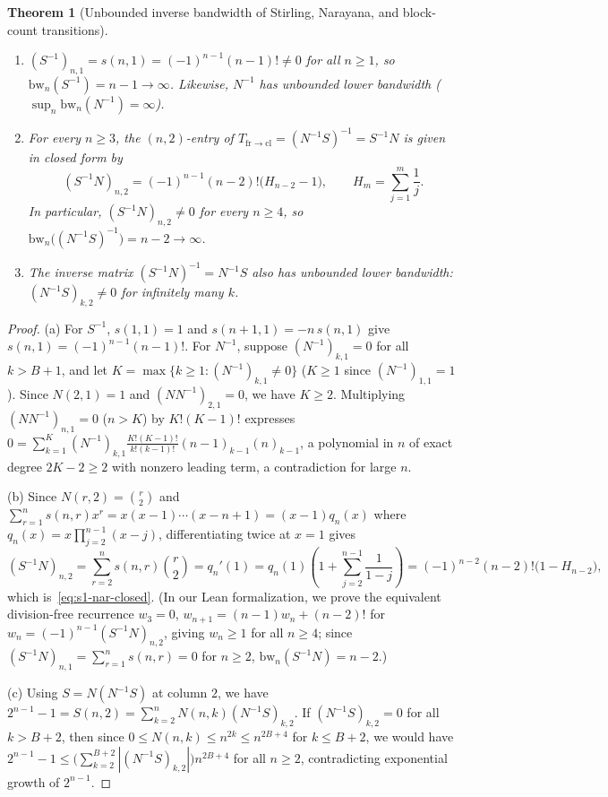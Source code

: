 \documentclass[11pt,a4paper]{article}
\newtheorem{theorem}{Theorem}[section]
\theoremstyle{definition}
\theoremstyle{remark}
\newcommand{\cl}{\mathrm{cl}}
\newcommand{\fr}{\mathrm{fr}}
\begin{document}
\begin{theorem}[Unbounded inverse bandwidth of Stirling, Narayana, and block-count transitions]\label{thm:stirling-narayana-bw}
\leavevmode
\begin{enumerate}
  \item[(a)] $(S^{-1})_{n,1} = s(n,1) = (-1)^{n-1}(n-1)! \ne 0$ for all $n \ge 1$, so $\mathrm{bw}_n(S^{-1}) = n - 1 \to \infty$. Likewise, $N^{-1}$ has unbounded lower bandwidth ($\sup_n \mathrm{bw}_n(N^{-1}) = \infty$).
  \item[(b)] For every $n \ge 3$, the $(n,2)$-entry of $T_{\fr\to\cl} = (N^{-1}S)^{-1} = S^{-1}N$ is given in closed form by
  \begin{equation}\label{eq:s1-nar-closed}
    (S^{-1}N)_{n,2} = (-1)^{n-1}(n - 2)!\bigl(H_{n-2} - 1\bigr), \qquad H_m = \sum_{j=1}^m \frac{1}{j}.
  \end{equation}
  In particular, $(S^{-1}N)_{n,2} \ne 0$ for every $n \ge 4$, so $\mathrm{bw}_n\bigl((N^{-1}S)^{-1}\bigr) = n - 2 \to \infty$.
  \item[(c)] The inverse matrix $(S^{-1}N)^{-1} = N^{-1}S$ also has unbounded lower bandwidth: $(N^{-1}S)_{k,2} \ne 0$ for infinitely many $k$.
\end{enumerate}
\end{theorem}

\begin{proof}
(a) For $S^{-1}$, $s(1,1) = 1$ and $s(n+1,1) = -n\,s(n,1)$ give $s(n,1) = (-1)^{n-1}(n-1)!$. For $N^{-1}$, suppose $(N^{-1})_{k,1} = 0$ for all $k > B + 1$, and let $K = \max\{k \ge 1 : (N^{-1})_{k,1} \ne 0\}$ ($K \ge 1$ since $(N^{-1})_{1,1} = 1$). Since $N(2,1) = 1$ and $(N N^{-1})_{2,1} = 0$, we have $K \ge 2$. Multiplying $(N N^{-1})_{n,1} = 0$ ($n > K$) by $K!(K-1)!$ expresses $0 = \sum_{k=1}^K (N^{-1})_{k,1} \frac{K!(K-1)!}{k!(k-1)!} (n-1)_{k-1}(n)_{k-1}$, a polynomial in $n$ of exact degree $2K - 2 \ge 2$ with nonzero leading term, a contradiction for large $n$.

(b) Since $N(r,2) = \binom{r}{2}$ and $\sum_{r=1}^n s(n,r) x^r = x(x-1)\cdots(x-n+1) = (x-1)q_n(x)$ where $q_n(x) = x\prod_{j=2}^{n-1}(x-j)$, differentiating twice at $x = 1$ gives
\[
  (S^{-1}N)_{n,2} = \sum_{r=2}^n s(n,r)\binom{r}{2} = q_n'(1) = q_n(1)\left(1 + \sum_{j=2}^{n-1}\frac{1}{1-j}\right) = (-1)^{n-2}(n-2)!\bigl(1 - H_{n-2}\bigr),
\]
which is~\eqref{eq:s1-nar-closed}. (In our Lean formalization, we prove the equivalent division-free recurrence $w_3 = 0$, $w_{n+1} = (n-1)w_n + (n-2)!$ for $w_n = (-1)^{n-1}(S^{-1}N)_{n,2}$, giving $w_n \ge 1$ for all $n \ge 4$; since $(S^{-1}N)_{n,1} = \sum_{r=1}^n s(n,r) = 0$ for $n \ge 2$, $\mathrm{bw}_n(S^{-1}N) = n - 2$.)

(c) Using $S = N(N^{-1}S)$ at column $2$, we have $2^{n-1} - 1 = S(n,2) = \sum_{k=2}^n N(n,k)(N^{-1}S)_{k,2}$. If $(N^{-1}S)_{k,2} = 0$ for all $k > B + 2$, then since $0 \le N(n,k) \le n^{2k} \le n^{2B+4}$ for $k \le B + 2$, we would have $2^{n-1} - 1 \le \bigl(\sum_{k=2}^{B+2} |(N^{-1}S)_{k,2}|\bigr) n^{2B+4}$ for all $n \ge 2$, contradicting exponential growth of $2^{n-1}$.
\end{proof}
\end{document}
